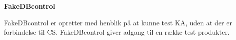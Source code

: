 \textbf{FakeDBcontrol}

FakeDBcontrol er opretter med henblik på at kunne test \gls{KA}, uden at der er forbindelse til \gls{CS}. FakeDBcontrol giver adgang til en række test produkter.

\bigskip